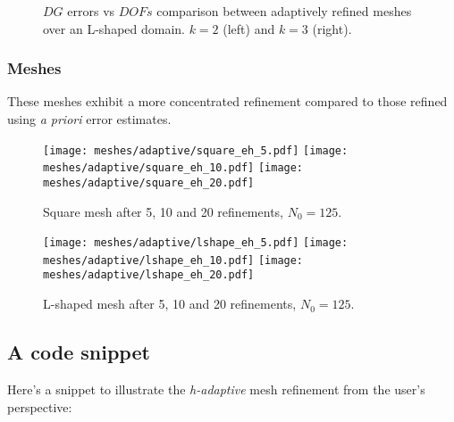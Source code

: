 \begin{figure}[!ht]
	\begin{subfigure}[b]{0.45\textwidth}
		
	\end{subfigure}
	\hfill
	\begin{subfigure}[b]{0.45\textwidth}
	\end{subfigure}
    \caption{$DG$ errors vs $DOFs$ comparison between adaptively refined meshes over an L-shaped domain. $k = 2$ (left) and $k = 3$ (right).}
\end{figure}

\newpage
\subsubsection{Meshes}

These meshes exhibit a more concentrated refinement compared to those refined using \textit{a priori} error estimates.

\begin{figure}[!ht]
	\centering
	\texttt{[image: meshes/adaptive/square\_eh\_5.pdf]}
	\texttt{[image: meshes/adaptive/square\_eh\_10.pdf]}
	\texttt{[image: meshes/adaptive/square\_eh\_20.pdf]}
	\caption{Square mesh after 5, 10 and 20 refinements, $N_0 = 125$.}
\end{figure}

\begin{figure}[!ht]
	\centering
	\texttt{[image: meshes/adaptive/lshape\_eh\_5.pdf]}
	\texttt{[image: meshes/adaptive/lshape\_eh\_10.pdf]}
	\texttt{[image: meshes/adaptive/lshape\_eh\_20.pdf]}
	\caption{L-shaped mesh after 5, 10 and 20 refinements, $N_0 = 125$.}
\end{figure}

\newpage
\subsection{A code snippet}

Here's a snippet to illustrate the \textit{h-adaptive} mesh refinement from the user's perspective:

